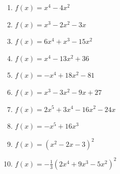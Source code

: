 \documentclass[12pt,a4paper]{article}
\begin{document}
	
	\begin{enumerate}[label=(\arabic*), leftmargin=*, labelsep=0.35em, itemsep=0pt, topsep=0pt]
		\item \(\displaystyle f(x) = x^{4} - 4x^{2}\)
		\item \(\displaystyle f(x) = x^{3} - 2x^{2} - 3x\)
		\item \(\displaystyle f(x) = 6x^{4} + x^{3} - 15x^{2}\)
		\item \(\displaystyle f(x) = x^{4} - 13x^{2} + 36\)
		\item \(\displaystyle f(x) = -x^{4} + 18x^{2} - 81\)
		\item \(\displaystyle f(x) = x^{3} - 3x^{2} - 9x + 27\)
		\item \(\displaystyle f(x) = 2x^{5} + 3x^{4} - 16x^{2} - 24x\)
		\item \(\displaystyle f(x) = -x^{5} + 16x^{3}\)
		\item \(\displaystyle f(x) = (x^{2} - 2x - 3)^{2}\)
		\item \(\displaystyle f(x) = -\tfrac{1}{3}\left(2x^{4} + 9x^{3} - 5x^{2}\right)^{2}\)
	\end{enumerate}
	
\end{document}
